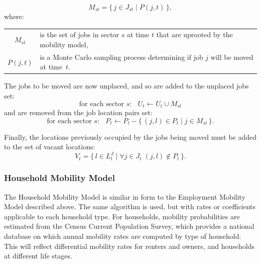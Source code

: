 \documentclass[fleqn]{article}
\newcommand{\JL}{L^J}
\begin{document}
\begin{equation}
M_{st} = \{\, j \in J_{st} \mid P(j, t) \,\},
\end{equation}
where:
\begin{center}
\begin{tabular}{c p{5.5in}}
$M_{st}$ & is the set of jobs in sector $s$ at time $t$ that are
uprooted by the mobility model,\\
$P(j, t)$ & is a Monte Carlo sampling process determining if job
$j$ will be moved at \mbox{time $t$}.\\
\end{tabular}
\end{center}

The jobs to be moved are now unplaced, and so are added to the unplaced
jobs set:
\begin{equation}
\text{for each sector $s$: } \;\; U_t \leftarrow  U_t \cup M_{st}
\end{equation}
and are removed from the job location pairs set:
\begin{equation}
\text{for each sector $s$: } \;\; P_t \leftarrow  P_t -
    \{\, (j,l) \in P_t \mid j \in M_{st} \,\}.
\end{equation}

Finally, the locations previously occupied by the jobs being moved
must be added to the set of vacant locations:
\begin{equation}
V_t = \{\, l \in \JL_{t} \mid \forall j \in J_{t} \; (j, l)
\notin P_t \,\}.
\end{equation}


\subsubsection{Household Mobility Model}

The Household Mobility Model is similar in form to the Employment
Mobility Model described above.  The same algorithm is used, but
with rates or coefficients applicable to each household type.  For
households, mobility probabilities are estimated from the Census
Current Population Survey, which provides a national database on
which annual mobility rates are computed by type of household.
This will reflect differential mobility rates for renters and
owners, and households at different life stages.
\end{document}
